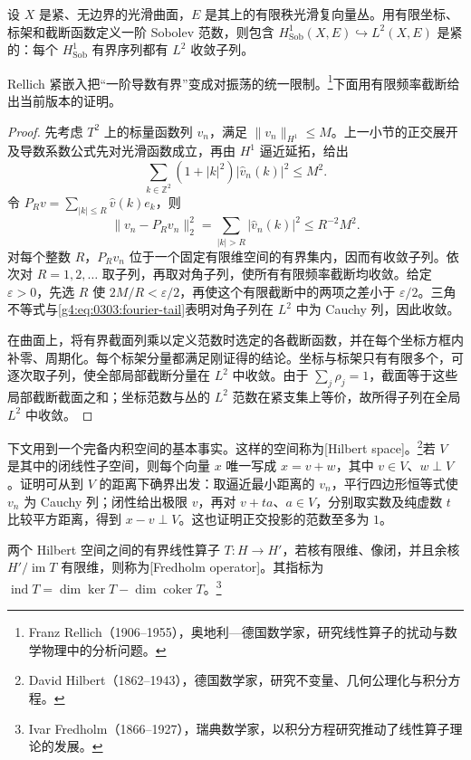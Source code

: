 \begin{lemma}
	\label{g4:lem:0303:rellich}
	设 \(X\) 是紧、无边界的光滑曲面，\(E\) 是其上的有限秩光滑复向量丛。用有限坐标、标架和截断函数定义一阶 Sobolev 范数，则包含 \(H^1_{\mathrm{Sob}}(X,E)\hookrightarrow L^2(X,E)\) 是紧的：每个 \(H^1_{\mathrm{Sob}}\) 有界序列都有 \(L^2\) 收敛子列。
\end{lemma}
Rellich 紧嵌入把“一阶导数有界”变成对振荡的统一限制。\footnote{Franz Rellich（1906--1955），奥地利—德国数学家，研究线性算子的扰动与数学物理中的分析问题。}下面用有限频率截断给出当前版本的证明。
\begin{proof}
	先考虑 \(T^2\) 上的标量函数列 \(v_n\)，满足 \(\|v_n\|_{H^1}\le M\)。上一小节的正交展开及导数系数公式先对光滑函数成立，再由 \(H^1\) 逼近延拓，给出
	\[
		\sum_{k\in\mathbb Z^2}(1+|k|^2)|\widehat v_n(k)|^2\le M^2.
	\]
	令 \(P_Rv=\sum_{|k|\le R}\widehat v(k)e_k\)，则
	\begin{equation}
		\label{g4:eq:0303:fourier-tail}
		\|v_n-P_Rv_n\|_2^2
		=\sum_{|k|>R}|\widehat v_n(k)|^2\le R^{-2}M^2.
	\end{equation}
	对每个整数 \(R\)，\(P_Rv_n\) 位于一个固定有限维空间的有界集内，因而有收敛子列。依次对 \(R=1,2,\ldots\) 取子列，再取对角子列，使所有有限频率截断均收敛。给定 \(\varepsilon>0\)，先选 \(R\) 使 \(2M/R<\varepsilon/2\)，再使这个有限截断中的两项之差小于 \(\varepsilon/2\)。三角不等式与\eqref{g4:eq:0303:fourier-tail}表明对角子列在 \(L^2\) 中为 Cauchy 列，因此收敛。

	在曲面上，将有界截面列乘以定义范数时选定的各截断函数，并在每个坐标方框内补零、周期化。每个标架分量都满足刚证得的结论。坐标与标架只有有限多个，可逐次取子列，使全部局部截断分量在 \(L^2\) 中收敛。由于 \(\sum_j\rho_j=1\)，截面等于这些局部截断截面之和；坐标范数与丛的 \(L^2\) 范数在紧支集上等价，故所得子列在全局 \(L^2\) 中收敛。
\end{proof}

下文用到一个完备内积空间的基本事实。这样的空间称为[Hilbert space]。\footnote{David Hilbert（1862--1943），德国数学家，研究不变量、几何公理化与积分方程。}若 \(V\) 是其中的闭线性子空间，则每个向量 \(x\) 唯一写成 \(x=v+w\)，其中 \(v\in V\)、\(w\perp V\)。证明可从到 \(V\) 的距离下确界出发：取逼近最小距离的 \(v_n\)，平行四边形恒等式使 \(v_n\) 为 Cauchy 列；闭性给出极限 \(v\)，再对 \(v+t a\)、\(a\in V\)，分别取实数及纯虚数 \(t\) 比较平方距离，得到 \(x-v\perp V\)。这也证明正交投影的范数至多为 \(1\)。

\begin{definition}
	\label{g4:def:0303:fredholm}
	两个 Hilbert 空间之间的有界线性算子 \(T:H\to H'\)，若核有限维、像闭，并且余核 \(H'/\operatorname{im}T\) 有限维，则称为[Fredholm operator]。其指标为 \(\operatorname{ind}T=\dim\ker T-\dim\operatorname{coker}T\)。\footnote{Ivar Fredholm（1866--1927），瑞典数学家，以积分方程研究推动了线性算子理论的发展。}
\end{definition}

